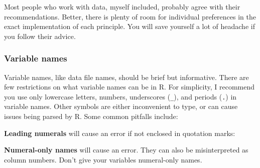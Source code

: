 \documentclass[
  13,
  letterpaper,
]{report}
\newenvironment{Shaded}{\begin{snugshade}}{\end{snugshade}}
\newcommand{\CommentTok}[1]{\textcolor[rgb]{0.37,0.37,0.37}{#1}}
\newcommand{\DecValTok}[1]{\textcolor[rgb]{0.68,0.00,0.00}{#1}}
\newcommand{\FunctionTok}[1]{\textcolor[rgb]{0.28,0.35,0.67}{#1}}
\newcommand{\NormalTok}[1]{\textcolor[rgb]{0.00,0.23,0.31}{#1}}
\newcommand{\OtherTok}[1]{\textcolor[rgb]{0.00,0.23,0.31}{#1}}
\newcommand{\SpecialCharTok}[1]{\textcolor[rgb]{0.37,0.37,0.37}{#1}}
\newcommand{\StringTok}[1]{\textcolor[rgb]{0.13,0.47,0.30}{#1}}
\begin{document}
Most people who work with data, myself included, probably agree with
their recommendations. Better, there is plenty of room for individual
preferences in the exact implementation of each principle. You will save
yourself a lot of headache if you follow their advice.

\subsubsection{Variable names}\label{sec-04-format-set-vars}

Variable names, like data file names, should be brief but informative.
There are few restrictions on what variable names can be in R. For
simplicity, I recommend you use only lowercase letters, numbers,
underscores (\texttt{\_}), and periods (\texttt{.}) in variable names.
Other symbols are either inconvenient to type, or can cause issues being
parsed by R. Some common pitfalls include:

\textbf{Leading numerals} will cause an error if not enclosed in
quotation marks:

\begin{Shaded}
\end{Shaded}

\textbf{Numeral-only names} will cause an error. They can also be
misinterpreted as column numbers. Don't give your variables numeral-only
names.

\begin{Shaded}
\end{Shaded}
\end{document}
